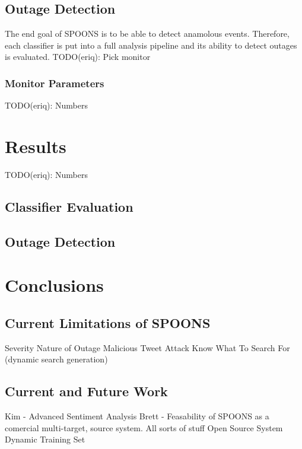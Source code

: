 \documentclass[12pt]{ucthesis}
\begin{document}
\section{Outage Detection}
\label{exp-outage}
The end goal of SPOONS is to be able to detect anamolous events. Therefore, each classifier is put into a full analysis pipeline
and its ability to detect outages is evaluated.
TODO(eriq): Pick monitor

\subsection{Monitor Parameters}
\label{exp-monitor-params}
TODO(eriq): Numbers

\chapter{Results}
\label{results}
TODO(eriq): Numbers

\section{Classifier Evaluation}
\label{res-classifier}



\section{Outage Detection}
\label{res-outage}

\chapter{Conclusions}
\label{conclusions}

\section{Current Limitations of SPOONS}
\label{limitations}
Severity
Nature of Outage
Malicious Tweet Attack
Know What To Search For (dynamic search generation)

\section{Current and Future Work}
\label{future-work}
Kim - Advanced Sentiment Analysis
Brett - Feasability of SPOONS as a comercial multi-target, source system.
All sorts of stuff
Open Source System
Dynamic Training Set

\end{document}
